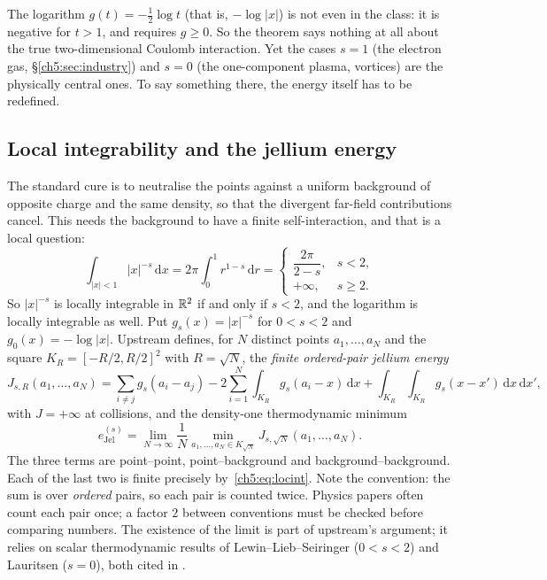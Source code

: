 The logarithm $g(t)=-\tfrac12\log t$ (that is, $-\log|x|$) is not even in the class: it is negative for $t>1$, and
 requires $g\ge0$. So the theorem says nothing at all about the true two-dimensional
Coulomb interaction. Yet the cases $s=1$ (the electron gas, \S\ref{ch5:sec:industry}) and $s=0$ (the one-component
plasma, vortices) are the physically central ones. To say something there, the energy itself has to be redefined.

\subsection{Local integrability and the jellium energy}

The standard cure is to neutralise the points against a uniform background of opposite charge and the same density,
so that the divergent far-field contributions cancel. This needs the background to have a finite self-interaction,
and that is a local question:
\begin{equation}\label{ch5:eq:locint}
\int_{|x|<1}|x|^{-s}\,\mathrm{d}x=2\pi\int_0^1 r^{1-s}\,\mathrm{d}r=
\begin{cases}\dfrac{2\pi}{2-s},& s<2,\\[1ex] +\infty,& s\ge2.\end{cases}
\end{equation}
So $|x|^{-s}$ is locally integrable in $\mathbb{R}^2$ if and only if $s<2$, and the logarithm is locally integrable as well.
Put $g_s(x)=|x|^{-s}$ for $0<s<2$ and $g_0(x)=-\log|x|$. Upstream \cite[\S8, eq.~(finite-ordered-jellium)]{oai}
defines, for $N$ distinct points $a_1,\dots,a_N$ and the square $K_R=[-R/2,R/2]^2$ with $R=\sqrt N$, the
\emph{finite ordered-pair jellium energy}
\begin{equation}\label{ch5:eq:jellium}
J_{s,R}(a_1,\dots,a_N)=\sum_{i\ne j}g_s(a_i-a_j)-2\sum_{i=1}^N\int_{K_R}g_s(a_i-x)\,\mathrm{d}x
+\int_{K_R}\int_{K_R}g_s(x-x')\,\mathrm{d}x\,\mathrm{d}x',
\end{equation}
with $J=+\infty$ at collisions, and the density-one thermodynamic minimum
\[
e^{(s)}_{\mathrm{Jel}}=\lim_{N\to\infty}\frac1N\min_{a_1,\dots,a_N\in K_{\sqrt N}}J_{s,\sqrt N}(a_1,\dots,a_N).
\]
The three terms are point--point, point--background and background--background. Each of the last two is finite
precisely by~\eqref{ch5:eq:locint}. Note the convention: the sum is over \emph{ordered} pairs, so each pair is counted
twice. Physics papers often count each pair once; a factor $2$ between conventions must be checked before comparing
numbers. The existence of the limit is part of upstream's argument; it relies on scalar thermodynamic results of
Lewin--Lieb--Seiringer ($0<s<2$) and Lauritsen ($s=0$), both cited in \cite[\S8]{oai}.

